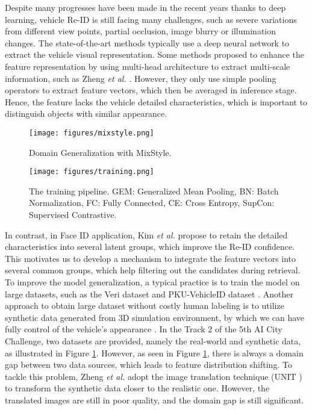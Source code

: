 \documentclass[10pt,twocolumn,letterpaper]{article}
\begin{document}
Despite many progresses have been made in the recent years thanks to deep learning, vehicle Re-ID is still facing many challenges, such as severe variations from different view points, partial occlusion, image blurry or illumination changes. The state-of-the-art methods \cite{1st, 2nd, 3rd} typically use a deep neural network to extract the vehicle visual representation. Some methods proposed to enhance the feature representation by using multi-head architecture to extract multi-scale information, such as 
Zheng {\it et al.} \cite{1st}. However, they only use simple pooling operators to extract feature vectors, which then be averaged in inference stage. Hence, the feature lacks the vehicle detailed characteristics, which is important to distinguish objects with similar appearance. 
\begin{figure}[H]
	\texttt{[image: figures/mixstyle.png]}
	\caption{Domain Generalization with MixStyle.}
	\label{fig:mixstyle}
\end{figure}
\begin{figure*}
	\centering
	\texttt{[image: figures/training.png]}
	\caption{The training pipeline. GEM: Generalized Mean Pooling, BN: Batch Normalization, FC: Fully Connected, CE: Cross Entropy, SupCon: Supervised Contrastive.}
	\label{fig:training}
\end{figure*}
In contrast, in Face ID application, Kim {\it et al.} \cite{groupface} propose to retain the detailed characteristics into several latent groups, which improve the Re-ID confidence. 
This motivates us to develop a mechanism to integrate the feature vectors into several common groups, which help filtering out the candidates during retrieval. 
To improve the model generalization, a typical practice is to train the model on large datasets, such as the Veri dataset \cite{veri} and PKU-VehicleID dataset \cite{pku-dataset}. Another approach to obtain large dataset without costly human labeling is to utilize synthetic data generated from 3D simulation environment, by which we can have fully control of the vehicle's appearance \cite{vehicleX}. In the Track 2 of the 5th AI City Challenge, two datasets are provided, namely the real-world and synthetic data, as illustrated in Figure \ref{fig:mixstyle}. However, as seen in Figure \ref{fig:mixstyle}, there is always a domain gap between two data sources, which leads to feature distribution shifting. To tackle this problem, Zheng {\it et al.} \cite{1st} adopt the image translation technique (UNIT \cite{unit}) to transform the synthetic data closer to the realistic one. However, the translated images are still in poor quality, and the domain gap is still significant. 
\end{document}
